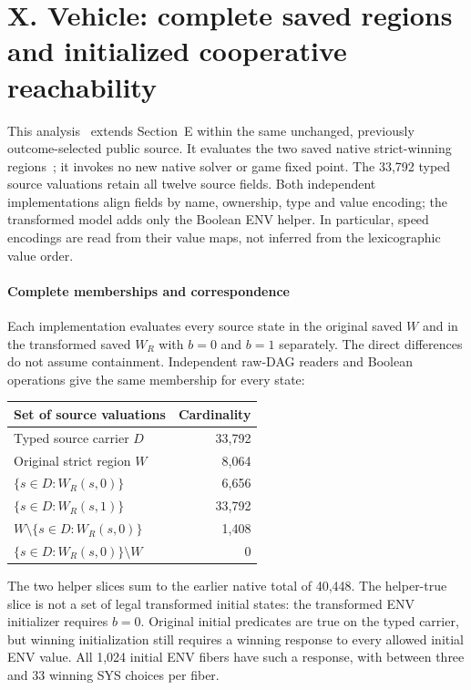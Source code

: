 \section*{X. Vehicle: complete saved regions and initialized cooperative reachability}
This analysis~\cite{vehiclewholeartifact} extends Section~E within the same unchanged, previously
outcome-selected public source. It evaluates the two saved native
strict-winning regions~\cite{vehicleartifact}; it invokes no new native
solver or game fixed point. The 33,792 typed source valuations retain
all twelve source fields. Both independent implementations align fields
by name, ownership, type and value encoding; the transformed model adds
only the Boolean ENV helper. In particular, speed encodings are read
from their value maps, not inferred from the lexicographic value order.

\paragraph{Complete memberships and correspondence}
Each implementation evaluates every source state in the original saved
$W$ and in the transformed saved $W_R$ with $b=0$ and $b=1$ separately.
The direct differences do not assume containment. Independent raw-DAG
readers and Boolean operations give the same membership for every state:
\begin{center}
\begin{tabular}{@{}lr@{}}\toprule
Set of source valuations & Cardinality\\\midrule
Typed source carrier $D$ & 33,792\\
Original strict region $W$ & 8,064\\
$\{s\in D:W_R(s,0)\}$ & 6,656\\
$\{s\in D:W_R(s,1)\}$ & 33,792\\
$W\setminus\{s\in D:W_R(s,0)\}$ & 1,408\\
$\{s\in D:W_R(s,0)\}\setminus W$ & 0\\\bottomrule
\end{tabular}
\end{center}
The two helper slices sum to the earlier native total of 40,448.
The helper-true slice is not a set of legal transformed initial states:
the transformed ENV initializer requires $b=0$. Original initial
predicates are true on the typed carrier, but winning initialization
still requires a winning response to every allowed initial ENV value.
All 1,024 initial ENV fibers have such a response, with between three
and 33 winning SYS choices per fiber.

